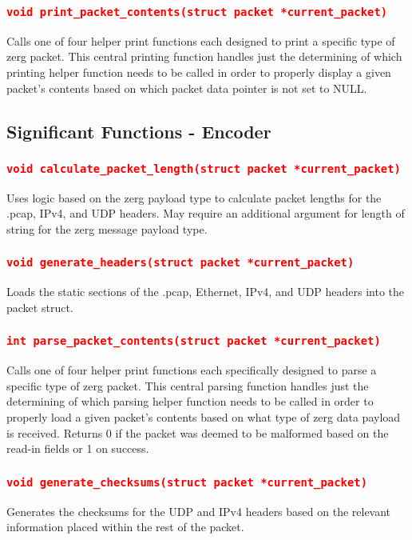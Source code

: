 \documentclass[11pt]{report}
\begin{document}
\subsubsection*{\texttt{\textcolor{red}{void print\_packet\_contents(struct packet *current\_packet)}}}
Calls one of four helper print functions each designed to print a specific type of zerg packet. This central printing function handles just the determining of which printing helper function needs to be called in order to properly display a given packet's contents based on which packet data pointer is not set to NULL.
\pagebreak
\subsection*{Significant Functions - Encoder}
\subsubsection*{\texttt{\textcolor{red}{void calculate\_packet\_length(struct packet *current\_packet)}}}
Uses logic based on the zerg payload type to calculate packet lengths for the .pcap, IPv4, and UDP headers. May require an additional argument for length of string for the zerg message payload type.
\subsubsection*{\texttt{\textcolor{red}{void generate\_headers(struct packet *current\_packet)}}}
Loads the static sections of the .pcap, Ethernet, IPv4, and UDP headers into the packet struct.
\subsubsection*{\texttt{\textcolor{red}{int parse\_packet\_contents(struct packet *current\_packet)}}}
Calls one of four helper print functions each specifically designed to parse a specific type of zerg packet. This central parsing function handles just the determining of which parsing helper function needs to be called in order to properly load a given packet's contents based on what type of zerg data payload is received. Returns 0 if the packet was deemed to be malformed based on the read-in fields or 1 on success.
\pagebreak
\subsubsection*{\texttt{\textcolor{red}{void generate\_checksums(struct packet *current\_packet)}}}
Generates the checksums for the UDP and IPv4 headers based on the relevant information placed within the rest of the packet.
\end{document}
